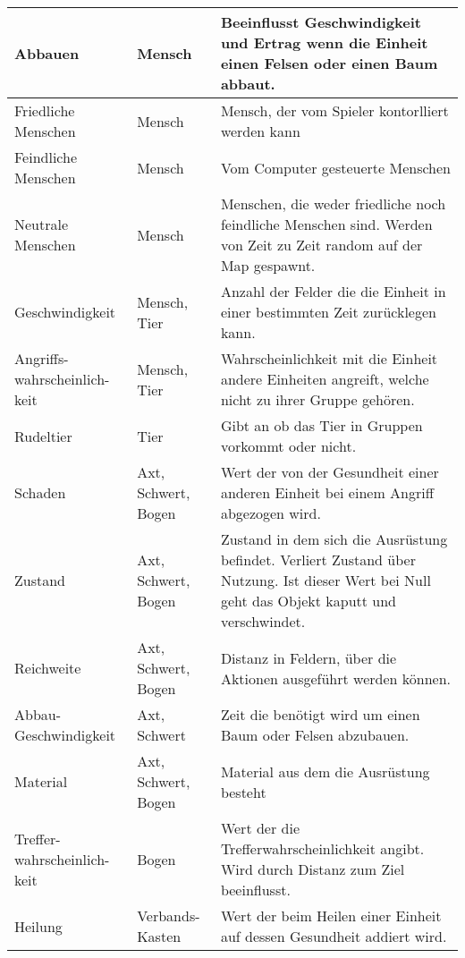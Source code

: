 \documentclass[a4paper,
  twoside, %
  headlines=2.1 %
  ]{scrartcl}
\begin{document}
\begin{center}
\begin{longtable}{ | p{2.5cm} | p{2cm} | p{10cm} | }
				\hline
				Abbauen & Mensch & Beeinflusst Geschwindigkeit und Ertrag wenn die Einheit einen Felsen oder einen Baum abbaut. \\
				\hline
				Friedliche Menschen & Mensch & Mensch, der vom Spieler kontorlliert werden kann \\
				\hline
				Feindliche Menschen & Mensch & Vom Computer gesteuerte Menschen \\
				\hline
				Neutrale Menschen & Mensch & Menschen, die weder friedliche noch feindliche Menschen sind. Werden von Zeit zu Zeit random auf der Map gespawnt. \\
				\hline
				Geschwindigkeit & Mensch, Tier & Anzahl der Felder die die Einheit in einer bestimmten Zeit zurücklegen kann. \\
				\hline
				Angriffs-\linebreak wahrscheinlich-\linebreak keit & Mensch, Tier & Wahrscheinlichkeit mit die Einheit andere Einheiten angreift, welche nicht zu ihrer Gruppe gehören. \\
				\hline
				Rudeltier & Tier & Gibt an ob das Tier in Gruppen vorkommt oder nicht. \\
				\hline
				Schaden & Axt, Schwert, Bogen & Wert der von der Gesundheit einer anderen Einheit bei einem Angriff abgezogen wird. \\
				\hline
			    Zustand & Axt, Schwert, Bogen & Zustand in dem sich die Ausrüstung befindet. Verliert Zustand über Nutzung. Ist dieser Wert bei Null geht das Objekt kaputt und verschwindet. \\
			    \hline
				Reichweite & Axt, Schwert, Bogen & Distanz in Feldern, über die Aktionen ausgeführt werden können. \\
				\hline
				Abbau-\linebreak Geschwindigkeit & Axt, Schwert & Zeit die benötigt wird um einen Baum oder Felsen abzubauen. \\
				\hline
				Material & Axt, Schwert, Bogen & Material aus dem die Ausrüstung besteht \\
				\hline
				Treffer-\linebreak
				wahrscheinlich-\linebreak 
				keit & Bogen & Wert der die Trefferwahrscheinlichkeit angibt. Wird durch Distanz zum Ziel beeinflusst. \\
				\hline
				Heilung & Verbands-\linebreak Kasten & Wert der beim Heilen einer Einheit auf dessen Gesundheit addiert wird. \\

\end{longtable}
\end{center}
\end{document}
